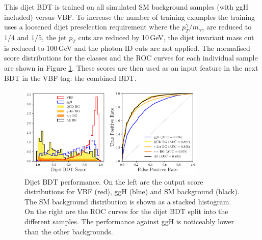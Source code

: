 This dijet BDT is trained on all simulated SM background samples (with ggH included) versus VBF. To increase the number of training examples the training uses a loosened dijet preselection requirement where the $p_{T}^{\gamma}/m_{\gamma\gamma}$ are reduced to $1/4$ and $1/5$, the jet $p_T$ cuts are reduced by 10\,GeV, the dijet invariant mass cut is reduced to 100\,GeV and the photon ID cuts are not applied.
The normalised score distributions for the classes and the ROC curves for each individual sample are shown in Figure \ref{fig:event_categorisaton:dijet_bdt_performance}.
These scores are then used as an input feature in the next BDT in the VBF tag: the combined BDT. 
\begin{figure}[h!]
    \centering
        \includegraphics[width=0.8\textwidth]{figures/event_selection/dijet_BDT_PS.pdf}
    \caption{Dijet BDT performance. On the left are the output score distributions for VBF (red), ggH (blue) and SM background (black). The SM background distribution is shown as a stacked histogram. On the right are the ROC curves for the dijet BDT split into the different samples. The performance against ggH is noticeably lower than the other backgrounds.}
    \label{fig:event_categorisaton:dijet_bdt_performance}
\end{figure}









